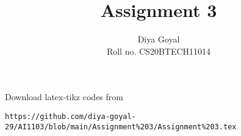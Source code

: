 \documentclass[journal,12pt,twocolumn]{IEEEtran}
\DeclareMathOperator*{\Res}{Res}
\begin{document}
\newcommand{\BEQA}{\begin{eqnarray}}
\newcommand{\EEQA}{\end{eqnarray}}
\newcommand{\define}{\stackrel{\triangle}{=}}

\raggedbottom
\setlength{\parindent}{0pt}
\providecommand{\mbf}{\mathbf}
\providecommand{\pr}[1]{\ensuremath{\Pr\left(#1\right)}}
\providecommand{\qfunc}[1]{\ensuremath{Q\left(#1\right)}}
\providecommand{\sbrak}[1]{\ensuremath{{}\left[#1\right]}}
\providecommand{\lsbrak}[1]{\ensuremath{{}\left[#1\right.}}
\providecommand{\rsbrak}[1]{\ensuremath{{}\left.#1\right]}}
\providecommand{\brak}[1]{\ensuremath{\left(#1\right)}}
\providecommand{\lbrak}[1]{\ensuremath{\left(#1\right.}}
\providecommand{\rbrak}[1]{\ensuremath{\left.#1\right)}}
\providecommand{\cbrak}[1]{\ensuremath{\left\{#1\right\}}}
\providecommand{\lcbrak}[1]{\ensuremath{\left\{#1\right.}}
\providecommand{\rcbrak}[1]{\ensuremath{\left.#1\right\}}}
\theoremstyle{remark}
\newtheorem{rem}{Remark}
\newcommand{\sgn}{\mathop{\mathrm{sgn}}}
\providecommand{\abs}[1]{\vert#1\vert}
\providecommand{\res}[1]{\Res\displaylimits_{#1}} 
\providecommand{\norm}[1]{\lVert#1\rVert}
\providecommand{\mtx}[1]{\mathbf{#1}}
\providecommand{\mean}[1]{E[ #1 ]}
\providecommand{\fourier}{\overset{\mathcal{F}}{ \rightleftharpoons}}
\providecommand{\system}{\overset{\mathcal{H}}{ \longleftrightarrow}}
\newcommand{\solution}{\noindent \textbf{Solution: }}
\newcommand{\cosec}{\,\text{cosec}\,}
\providecommand{\dec}[2]{\ensuremath{\overset{#1}{\underset{#2}{\gtrless}}}}
\newcommand{\myvec}[1]{\ensuremath{\begin{pmatrix}#1\end{pmatrix}}}
\newcommand{\mydet}[1]{\ensuremath{\begin{vmatrix}#1\end{vmatrix}}}
\makeatletter
{}
\makeatother
\let\StandardTheFigure\thefigure
\let\vec\mathbf
\renewcommand{\thefigure}{\theproblem}
\def\putbox#1#2#3{\makebox[0in][l]{\makebox[#1][l]{}\raisebox{\baselineskip}[0in][0in]{\raisebox{#2}[0in][0in]{#3}}}}
     \def\rightbox#1{\makebox[0in][r]{#1}}
     \def\centbox#1{\makebox[0in]{#1}}
     \def\topbox#1{\raisebox{-\baselineskip}[0in][0in]{#1}}
     \def\midbox#1{\raisebox{-0.5\baselineskip}[0in][0in]{#1}}
\vspace{3cm}
\title{Assignment 3}
\author{Diya Goyal\\ Roll no. CS20BTECH11014}
\maketitle
\newpage
\bigskip
\renewcommand{\thefigure}{\theenumi}
\renewcommand{\thetable}{\theenumi}
Download latex-tikz codes from 
\begin{lstlisting}
https://github.com/diya-goyal-29/AI1103/blob/main/Assignment%203/Assignment%203.tex
\end{lstlisting}
\end{document}

